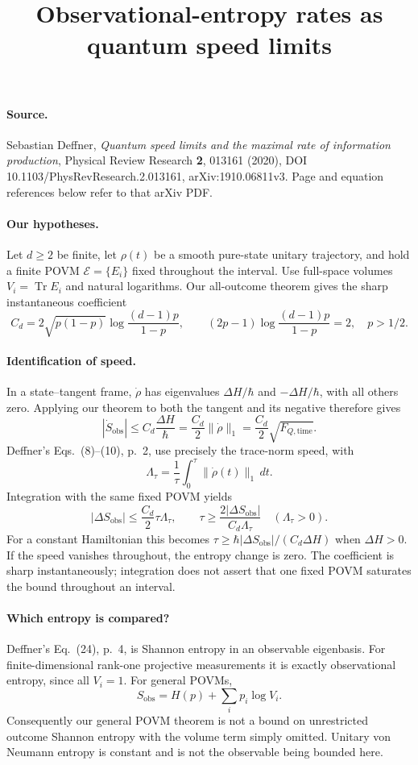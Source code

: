 \documentclass[11pt,a4paper]{article}
\title{Observational-entropy rates as quantum speed limits}
\author{}
\date{}
\newcommand{\Tr}{\operatorname{Tr}}
\begin{document}
\maketitle
\paragraph{Source.} Sebastian Deffner, \emph{Quantum speed limits and the maximal rate of information production}, Physical Review Research \textbf{2}, 013161 (2020), DOI 10.1103/PhysRevResearch.2.013161, arXiv:1910.06811v3. Page and equation references below refer to that arXiv PDF.
\paragraph{Our hypotheses.} Let $d\ge2$ be finite, let $\rho(t)$ be a smooth pure-state unitary trajectory, and hold a finite POVM $\mathcal E=\{E_i\}$ fixed throughout the interval. Use full-space volumes $V_i=\Tr E_i$ and natural logarithms. Our all-outcome theorem gives the sharp instantaneous coefficient
\[C_d=2\sqrt{p(1-p)}\log\frac{(d-1)p}{1-p},\qquad (2p-1)\log\frac{(d-1)p}{1-p}=2,\quad p>1/2.\]
\paragraph{Identification of speed.} In a state--tangent frame, $\dot\rho$ has eigenvalues $\Delta H/\hbar$ and $-\Delta H/\hbar$, with all others zero. Applying our theorem to both the tangent and its negative therefore gives
\[|\dot S_{\mathrm{obs}}|\le C_d\frac{\Delta H}{\hbar}=\frac{C_d}{2}\|\dot\rho\|_1=\frac{C_d}{2}\sqrt{F_{Q,\mathrm{time}}}.\]
Deffner's Eqs.~(8)--(10), p.~2, use precisely the trace-norm speed, with
\[\Lambda_\tau=\frac1\tau\int_0^\tau\|\dot\rho(t)\|_1\,dt.\]
Integration with the same fixed POVM yields
\[|\Delta S_{\mathrm{obs}}|\le\frac{C_d}{2}\tau\Lambda_\tau,\qquad \tau\ge\frac{2|\Delta S_{\mathrm{obs}}|}{C_d\Lambda_\tau}\quad(\Lambda_\tau>0).\]
For a constant Hamiltonian this becomes $\tau\ge\hbar|\Delta S_{\mathrm{obs}}|/(C_d\Delta H)$ when $\Delta H>0$. If the speed vanishes throughout, the entropy change is zero. The coefficient is sharp instantaneously; integration does not assert that one fixed POVM saturates the bound throughout an interval.
\paragraph{Which entropy is compared?} Deffner's Eq.~(24), p.~4, is Shannon entropy in an observable eigenbasis. For finite-dimensional rank-one projective measurements it is exactly observational entropy, since all $V_i=1$. For general POVMs,
\[S_{\mathrm{obs}}=H(p)+\sum_i p_i\log V_i.\]
Consequently our general POVM theorem is not a bound on unrestricted outcome Shannon entropy with the volume term simply omitted. Unitary von Neumann entropy is constant and is not the observable being bounded here.
\end{document}
